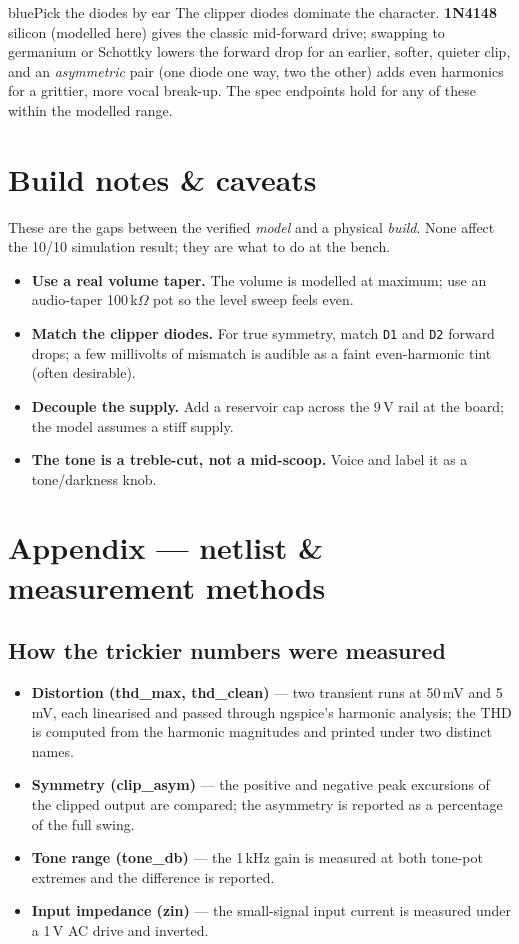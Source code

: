 \documentclass{schemaforge-report}
\begin{document}
\begin{callout}{blue}{Pick the diodes by ear}
The clipper diodes dominate the character. \textbf{1N4148} silicon (modelled here) gives the classic
mid-forward drive; swapping to germanium or Schottky lowers the forward drop for an earlier, softer,
quieter clip, and an \emph{asymmetric} pair (one diode one way, two the other) adds even harmonics for
a grittier, more vocal break-up. The spec endpoints hold for any of these within the modelled range.
\end{callout}

\section{Build notes \& caveats}
These are the gaps between the verified \emph{model} and a physical \emph{build}. None affect the
10/10 simulation result; they are what to do at the bench.
\begin{itemize}
  \item \textbf{Use a real volume taper.} The volume is modelled at maximum; use an audio-taper
  100\,k$\Omega$ pot so the level sweep feels even.
  \item \textbf{Match the clipper diodes.} For true symmetry, match \texttt{D1} and \texttt{D2} forward
  drops; a few millivolts of mismatch is audible as a faint even-harmonic tint (often desirable).
  \item \textbf{Decouple the supply.} Add a reservoir cap across the 9\,V rail at the board; the model
  assumes a stiff supply.
  \item \textbf{The tone is a treble-cut, not a mid-scoop.} Voice and label it as a tone/darkness knob.
\end{itemize}

\section{Appendix --- netlist \& measurement methods}
\subsection{How the trickier numbers were measured}
\begin{itemize}
  \item \textbf{Distortion (thd\_max, thd\_clean)} --- two transient runs at 50\,mV and 5\,mV, each
  linearised and passed through ngspice's harmonic analysis; the THD is computed from the harmonic
  magnitudes and printed under two distinct names.
  \item \textbf{Symmetry (clip\_asym)} --- the positive and negative peak excursions of the clipped
  output are compared; the asymmetry is reported as a percentage of the full swing.
  \item \textbf{Tone range (tone\_db)} --- the 1\,kHz gain is measured at both tone-pot extremes and the
  difference is reported.
  \item \textbf{Input impedance (zin)} --- the small-signal input current is measured under a 1\,V AC
  drive and inverted.
\end{itemize}
\end{document}
